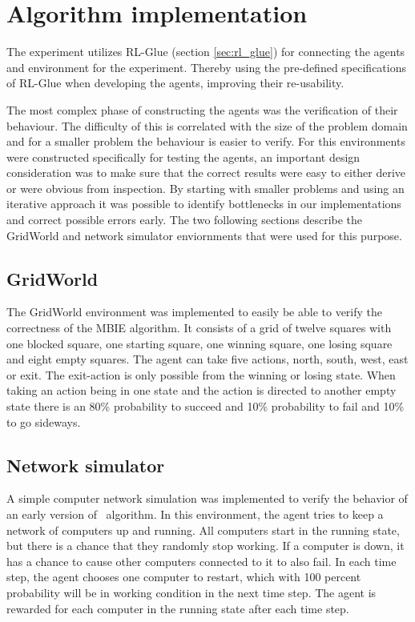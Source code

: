 \section{Algorithm implementation}
\label{sec:implementation}

The experiment utilizes RL-Glue (section \ref{sec:rl_glue}) for connecting the
agents and environment for the experiment. Thereby using the pre-defined
specifications of RL-Glue when developing the agents, improving their
re-usability. 

The most complex phase of constructing the agents was the verification of their
behaviour. The difficulty of this is correlated with the size of the problem
domain and for a smaller problem the behaviour is easier to verify. For this 
environments were constructed specifically for testing the agents, an
important design consideration was to make sure that the correct results were
easy to either derive or were obvious from inspection. By starting with smaller
problems and using an iterative approach it was possible to identify
bottlenecks in our implementations and correct possible errors early. The two
following sections describe the GridWorld and network simulator enviornments
that were used for this purpose. 

\subsection{GridWorld}
\label{sec:intro_grid_world}

The GridWorld environment was implemented to easily be able to verify the
correctness of the MBIE algorithm. It consists of a grid of twelve squares with
one blocked square, one starting square, one winning square, one losing square and
eight empty squares. The agent can take five actions, north, south, west,
east or exit. The exit-action is only possible from the winning or losing
state. When taking an action being in one state and the action is directed to
another empty state there is an 80\% probability to succeed and 10\%
probability to fail and 10\% to go sideways.

\subsection{Network simulator}

A simple computer network simulation was implemented to verify the behavior of an
early version of \etre\ algorithm. In this environment, the agent tries to keep
a network of computers up and running. All computers start in the running
state, but there is a chance that they randomly stop working. If a computer is
down, it has a chance to cause other computers connected to it to also fail. In
each time step, the agent chooses one computer to restart, which with 100
percent probability will be in working condition in the next time step. The
agent is rewarded for each computer in the running state after each time step. 





